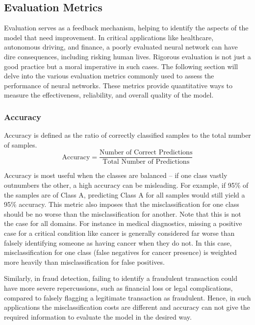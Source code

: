 \subsection{Evaluation Metrics}
\label{sec:eval}
Evaluation serves as a feedback mechanism, helping to identify the aspects of the model that need improvement. In critical applications like healthcare, autonomous driving, and finance, a poorly evaluated neural network can have dire consequences, including risking human lives. Rigorous evaluation is not just a good practice but a moral imperative in such cases. The following section will delve into the various evaluation metrics commonly used to assess the performance of neural networks. These metrics provide quantitative ways to measure the effectiveness, reliability, and overall quality of the model.

\subsubsection{Accuracy}

Accuracy is defined as the ratio of correctly classified samples to the total number of samples. 
\begin{equation*}
    \text{Accuracy} = \frac{\text{Number of Correct Predictions}}{\text{Total Number of Predictions}} 
\end{equation*}

Accuracy is most useful when the classes are balanced -- if one class vastly outnumbers the other, a high accuracy can be misleading. For example, if 95\% of the samples are of Class A, predicting Class A for all samples would still yield a 95\% accuracy. This metric also imposes that the misclassification for one class should be no worse than the misclassification for another. Note that this is not the case for all domains. For instance in medical diagnostics, missing a positive case for a critical condition like cancer is generally considered far worse than falsely identifying someone as having cancer when they do not. In this case, misclassification for one class (false negatives for cancer presence) is weighted more heavily than misclassification for false positives.

Similarly, in fraud detection, failing to identify a fraudulent transaction could have more severe repercussions, such as financial loss or legal complications, compared to falsely flagging a legitimate transaction as fraudulent. Hence, in such applications the misclassification costs are different and accuracy can not give the required information to evaluate the model in the desired way. 

